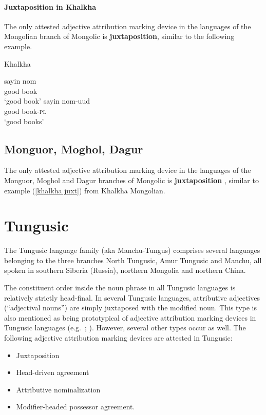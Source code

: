 \paragraph{Juxtaposition in Khalkha}
The only attested adjective attribution marking device in the languages of the Mongolian branch of Mongolic is \textbf{juxtaposition}, similar to the following example. 
\begin{exe}
\ex \rm{Khalkha \citep{svantesson2003}}
\label{khalkha juxt}
\begin{xlist}
\ex
\gll	sayin nom\\
	good book\\
\glt	‘good book’
\ex 
\gll	sayin nom-uud\\
	good book-\textsc{pl}\\
\glt ‘good books’
\end{xlist}
\end{exe}

\subsection{Monguor, Moghol, Dagur}
The only attested adjective attribution marking device in the languages of the Monguor, Moghol and Dagur branches of Mongolic is \textbf{juxtaposition} \citep{slater2003,weiers2003,tsumagari2003}, similar to example (\ref{khalkha juxt}) from Khalkha Mongolian.

\section{Tungusic} \label{tungusic synchr}
The Tungusic language family (aka Manchu-Tungus) comprises several languages belonging to the three branches North Tungusic, Amur Tungusic and Manchu, all spoken in southern Siberia (Russia), northern Mongolia and northern China.

The constituent order inside the noun phrase in all Tungusic languages is relatively strictly head-final. In several Tungusic languages, attributive adjectives (“adjectival nouns”) are simply juxtaposed with the modified noun. This type is also mentioned as being prototypical of adjective attribution marking devices in Tungusic languages (e.g.~\citealt{sunik1968a}; \citealt[133]{kormusin2005}). However, several other types occur as well. The following adjective attribution marking devices are attested in Tungusic:
\begin{itemize}
\item Juxtaposition
\item Head-driven agreement
\item Attributive nominalization
\item Modifier-headed possessor agreement.
\end{itemize}

